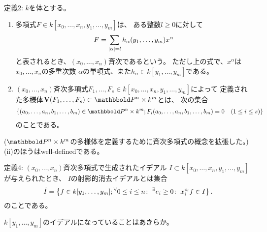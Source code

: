 \begin{framed}
  定義2:
  $k$を体とする。
  \begin{enumerate}[label=(\roman*)]
    \item 多項式$F\in k[x_0,\dots,x_n,y_1,\dots,y_m]$は、
    ある整数$l\ge 0$に対して
    \begin{align}
      F=\sum_{\left|\alpha\right|=l}h_\alpha(y_1,\dots,y_m)x^\alpha
    \end{align}
    と表されるとき、$(x_0,\dots,x_n)$斉次であるという。
    ただし上の式で、$x^\alpha$は$x_0,\dots,x_n$の多重次数
    $\alpha$の単項式、また$h_\alpha \in k[y_1,\dots,y_m]$である。
    \item
    $(x_0,\dots,x_n)$斉次多項式$F_1,\dots,F_s \in k[x_0,\dots,x_n,y_1,\dots,y_m]$によって
    定義された多様体$\var(F_1,\dots,F_s) \subset \P^n\times k^m$とは、
    次の集合
    \begin{align}
      \set{(a_0,\dots,a_n,b_1,\dots,b_m)\in \P^n\times k^m;
      F_i(a_0,\dots,a_n,b_1,\dots,b_m)= 0 \quad (1\le i \le s)}
    \end{align}
    のことである。
  \end{enumerate}
\end{framed}
($\P^n \times k^m$の多様体を定義するために斉次多項式の概念を拡張した。)
(ii)のほうはwell-definedである。


\begin{framed}
  定義4:
  $(x_0,\dots,x_n)$斉次多項式で生成されたイデアル
  $I\subset k[x_0,\dots,x_n,y_1,\dots,y_m]$が与えられたとき、
  $I$の射影的消去イデアルとは集合
  \begin{align}
    \hat I =
    \left\{f\in k[y_1,\dots,y_m];
    {}^{\forall}{0\le i \le n}\mathrm{\colon\;}{}^{\exists}{e_i\ge 0}\mathrm{\colon\;} x_i^{e_i}f \in I\right\}.
  \end{align}
  のことである。
\end{framed}
$k[y_1,\dots,y_m]$のイデアルになっていることはあきらか。

